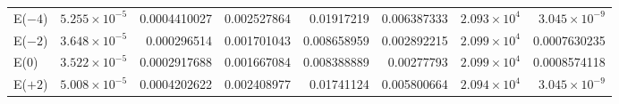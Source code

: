 \begin{table}[p]
\begin{tabular}{lrrrrrrr}
E($-4$) & $5.255\times10^{-5}$ & 0.0004410027 & 0.002527864 & 0.01917219 & 0.006387333 & $2.093\times10^{4}$ & $3.045\times10^{-9}$ \\
E($-2$) & $3.648\times10^{-5}$ & 0.000296514 & 0.001701043 & 0.008658959 & 0.002892215 & $2.099\times10^{4}$ & 0.0007630235 \\
E($0$) & $3.522\times10^{-5}$ & 0.0002917688 & 0.001667084 & 0.008388889 & 0.00277793 & $2.099\times10^{4}$ & 0.0008574118 \\
E($+2$) & $5.008\times10^{-5}$ & 0.0004202622 & 0.002408977 & 0.01741124 & 0.005800664 & $2.094\times10^{4}$ & $3.045\times10^{-9}$ \\
\hline
\end{tabular}
\endgroup
\end{table}
